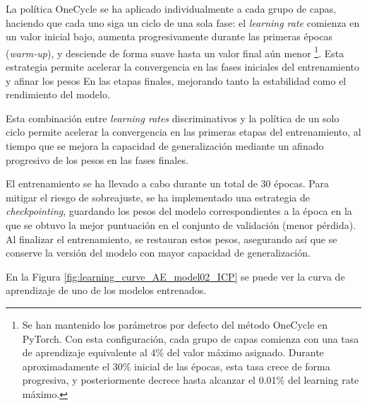 La política OneCycle se ha aplicado individualmente a cada grupo de capas, haciendo que cada uno siga un ciclo de una sola fase: el \textit{learning rate} comienza en un valor inicial bajo, aumenta progresivamente durante las primeras épocas (\textit{warm-up}), y desciende de forma suave hasta un valor final aún menor%
\footnote{
    Se han mantenido los parámetros por defecto del método OneCycle en PyTorch. Con esta configuración, cada grupo de capas comienza con una tasa de aprendizaje equivalente al 4\% del valor máximo asignado. Durante aproximadamente el 30\% inicial de las épocas, esta tasa crece de forma progresiva, y posteriormente decrece hasta alcanzar el 0.01\% del learning rate máximo.
}. 
Esta estrategia permite acelerar la convergencia en las fases iniciales del entrenamiento y afinar los pesos En las etapas finales, mejorando tanto la estabilidad como el rendimiento del modelo.

Esta combinación entre \textit{learning rates} discriminativos y la política de un solo ciclo permite acelerar la convergencia en las primeras etapas del entrenamiento, al tiempo que se mejora la capacidad de generalización mediante un afinado progresivo de los pesos en las fases finales.

El entrenamiento se ha llevado a cabo durante un total de 30 épocas. Para mitigar el riesgo de sobreajuste, se ha implementado una estrategia de \textit{checkpointing}, guardando los pesos del modelo correspondientes a la época en la que se obtuvo la mejor puntuación en el conjunto de validación (menor pérdida). Al finalizar el entrenamiento, se restauran estos pesos, asegurando así que se conserve la versión del modelo con mayor capacidad de generalización.

En la Figura \ref{fig:learning_curve_AE_model02_ICP} se puede ver la curva de aprendizaje de uno de los modelos entrenados.

